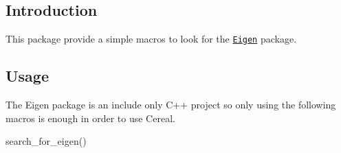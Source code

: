 \subsection*{Introduction}

This package provide a simple macros to look for the \href{http://eigen.tuxfamily.org/index.php?title=Main_Page}{\tt Eigen} package.

\subsection*{Usage}

The Eigen package is an include only C++ project so only using the following macros is enough in order to use Cereal. \begin{DoxyVerb}search_for_eigen() \end{DoxyVerb}
 